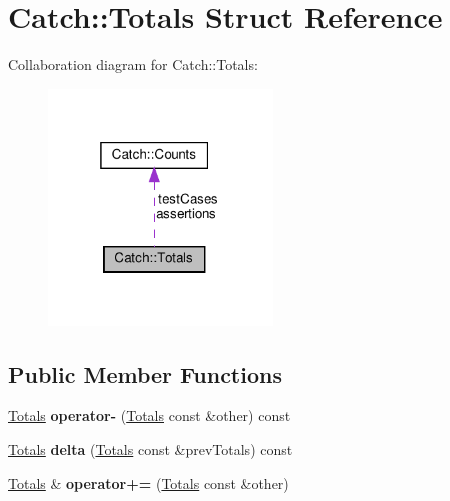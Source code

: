 \hypertarget{structCatch_1_1Totals}{}\section{Catch\+:\+:Totals Struct Reference}
\label{structCatch_1_1Totals}


Collaboration diagram for Catch\+:\+:Totals\+:
\nopagebreak
\begin{figure}[H]
\begin{center}
\leavevmode
\includegraphics[width=169pt]{structCatch_1_1Totals__coll__graph}
\end{center}
\end{figure}
\subsection*{Public Member Functions}
\begin{DoxyCompactItemize}
\item 
\mbox{\label{structCatch_1_1Totals_a9279ed39139cb7e7b291918a6d08290e}} 
\hyperlink{structCatch_1_1Totals}{Totals} {\bfseries operator-\/} (\hyperlink{structCatch_1_1Totals}{Totals} const \&other) const
\item 
\mbox{\label{structCatch_1_1Totals_a1a94a654f5f3786b75695e081fc9bca2}} 
\hyperlink{structCatch_1_1Totals}{Totals} {\bfseries delta} (\hyperlink{structCatch_1_1Totals}{Totals} const \&prev\+Totals) const
\item 
\mbox{\label{structCatch_1_1Totals_a574015076e54cc405c70b053e3356e43}} 
\hyperlink{structCatch_1_1Totals}{Totals} \& {\bfseries operator+=} (\hyperlink{structCatch_1_1Totals}{Totals} const \&other)
\end{DoxyCompactItemize}
